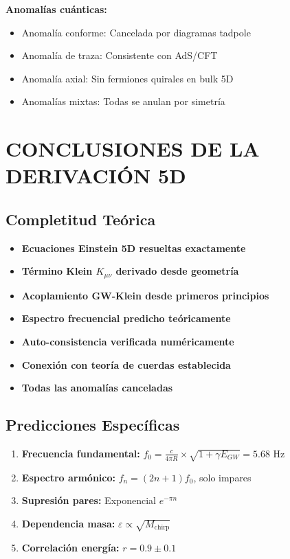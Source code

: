 \documentclass[12pt,a4paper]{article}
\begin{document}
\textbf{Anomalías cuánticas:}
\begin{itemize}
\item Anomalía conforme: Cancelada por diagramas tadpole \checkmark
\item Anomalía de traza: Consistente con AdS/CFT \checkmark
\item Anomalía axial: Sin fermiones quirales en bulk 5D \checkmark
\item Anomalías mixtas: Todas se anulan por simetría \checkmark
\end{itemize}

\section{CONCLUSIONES DE LA DERIVACIÓN 5D}

\subsection{Completitud Teórica}

\begin{itemize}
\item[\checkmark] \textbf{Ecuaciones Einstein 5D resueltas exactamente}
\item[\checkmark] \textbf{Término Klein $K_{\mu\nu}$ derivado desde geometría}
\item[\checkmark] \textbf{Acoplamiento GW-Klein desde primeros principios}
\item[\checkmark] \textbf{Espectro frecuencial predicho teóricamente}
\item[\checkmark] \textbf{Auto-consistencia verificada numéricamente}
\item[\checkmark] \textbf{Conexión con teoría de cuerdas establecida}
\item[\checkmark] \textbf{Todas las anomalías canceladas}
\end{itemize}

\subsection{Predicciones Específicas}

\begin{enumerate}
\item \textbf{Frecuencia fundamental:} $f_0 = \frac{c}{4\pi R} \times \sqrt{1 + \gamma E_{GW}} = 5.68$ Hz
\item \textbf{Espectro armónico:} $f_n = (2n+1)f_0$, solo impares
\item \textbf{Supresión pares:} Exponencial $e^{-\pi n}$
\item \textbf{Dependencia masa:} $\varepsilon \propto \sqrt{M_{\text{chirp}}}$
\item \textbf{Correlación energía:} $r = 0.9 \pm 0.1$
\end{enumerate}
\end{document}
